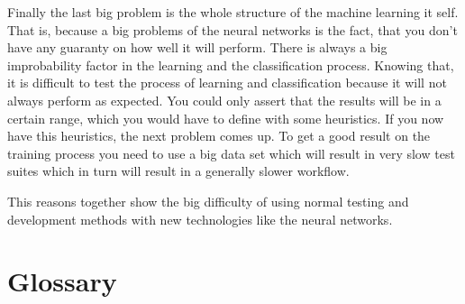 \documentclass[parskip=full]{scrartcl}
\begin{document}
Finally the last big problem is the whole structure of the machine learning it self.
That is, because a big problems of the neural networks is the fact, that you don't have any guaranty on how well it will perform.
There is always a big improbability factor in the learning and the classification process.
Knowing that, it is difficult to test the process of learning and classification because it will not always perform as expected.
You could only assert that the results will be in a certain range, which you would have to define with some heuristics.
If you now have this heuristics, the next problem comes up.
To get a good result on the training process you need to use a big data set which will result in very slow test suites which in turn will result in a generally slower workflow.


This reasons together show the big difficulty of using normal testing and development methods with new technologies like the neural networks.

\newpage

\section{Glossary}

%
\printnoidxglossaries
\end{document}
